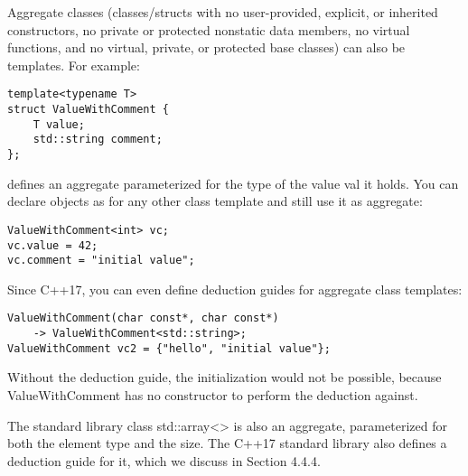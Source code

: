 

Aggregate classes (classes/structs with no user-provided, explicit, or inherited constructors, no private or protected nonstatic data members, no virtual functions, and no virtual, private, or protected base classes) can also be templates. For example:

\begin{lstlisting}[style=styleCXX]
template<typename T>
struct ValueWithComment {
	T value;
	std::string comment;
};
\end{lstlisting}

defines an aggregate parameterized for the type of the value val it holds. You can declare objects as for any other class template and still use it as aggregate:

\begin{lstlisting}[style=styleCXX]
ValueWithComment<int> vc;
vc.value = 42;
vc.comment = "initial value";
\end{lstlisting}

Since C++17, you can even define deduction guides for aggregate class templates:

\begin{lstlisting}[style=styleCXX]
ValueWithComment(char const*, char const*)
	-> ValueWithComment<std::string>;
ValueWithComment vc2 = {"hello", "initial value"};
\end{lstlisting}

Without the deduction guide, the initialization would not be possible, because ValueWithComment has no constructor to perform the deduction against.

The standard library class std::array<> is also an aggregate, parameterized for both the element type and the size. The C++17 standard library also defines a deduction guide for it, which we discuss in Section 4.4.4.
